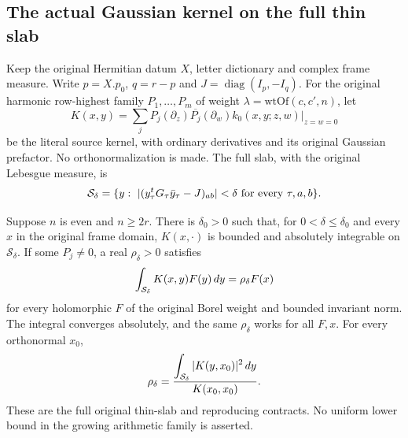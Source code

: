 \subsection{The actual Gaussian kernel on the full thin slab}
\label{actual-gaussian-reproduction}

Keep the original Hermitian datum $X$, letter dictionary and complex
frame measure. Write $p=X.p_0$, $q=r-p$ and
$J=\operatorname{diag}(I_p,-I_q)$. For the original harmonic
row-highest family $P_1,\ldots,P_m$ of weight
$\lambda=\mathrm{wtOf}(c,c',n)$, let
\[
 K(x,y)=\sum_j P_j(\partial_z)\overline{P_j}(\partial_w)
                              k_0(x,y;z,w)\big|_{z=w=0}
\]
be the literal source kernel, with ordinary derivatives and its
original Gaussian prefactor. No orthonormalization is made.
The full slab, with the original Lebesgue measure, is
\[
 {\cal S}_\delta=\{y:\ |(y_\tau^tG_\tau\bar y_\tau-J)_{ab}|<\delta
                                     \text{ for every }\tau,a,b\}.
\]

\begin{theorem}\label{actual-gaussian-reproduction-theorem}
Suppose $n$ is even and $n\ge2r$. There is $\delta_0>0$ such that,
for $0<\delta\le\delta_0$ and every $x$ in the original frame
domain, $K(x,\cdot)$ is bounded and absolutely integrable on
$\mathcal S_\delta$. If some $P_j\ne0$, a real $\rho_\delta>0$
satisfies
\begin{equation}\label{gaussian-actual-reproducing}
       \int_{{\cal S}_\delta}K(x,y)F(y)\,dy=\rho_\delta F(x)
\end{equation}
for every holomorphic $F$ of the original Borel weight and bounded
invariant norm. The integral converges absolutely, and the same
$\rho_\delta$ works for all $F,x$. For every orthonormal $x_0$,
\begin{equation}\label{gaussian-actual-rho}
 \rho_\delta=
 \frac{\displaystyle\int_{{\cal S}_\delta}|K(y,x_0)|^2\,dy}
      {K(x_0,x_0)}.
\end{equation}
These are the full original thin-slab and reproducing contracts.
No uniform lower bound in the growing arithmetic family is asserted.
\end{theorem}

